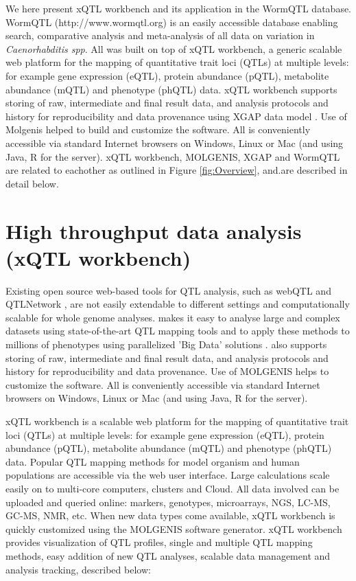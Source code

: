 We here present xQTL workbench and its application in the WormQTL database. WormQTL (http://www.wormqtl.org) is an 
easily accessible database enabling search, comparative analysis and meta-analysis of all data on variation in \emph{Caenorhabditis spp}.
All was built on top of xQTL workbench, a generic scalable web platform for the mapping of quantitative trait loci (QTLs)
 at multiple levels: for example gene expression (eQTL), protein abundance (pQTL), metabolite abundance (mQTL) and phenotype 
(phQTL) data. xQTL workbench supports storing of raw, intermediate and final result data, and analysis protocols and history 
for reproducibility and data provenance using XGAP data model \cite{Swertz:2010a}. Use of Molgenis \cite{Swertz:2010b} helped 
to build and customize the software. All is conveniently accessible via standard Internet browsers on Windows, Linux or Mac 
(and using Java, R for the server). xQTL workbench, MOLGENIS, XGAP and WormQTL are related to eachother as outlined in 
Figure \ref{fig:Overview}, and.are described in detail below.

\section{High throughput data analysis (xQTL workbench)}
Existing open source web-based tools for QTL analysis, such as webQTL \cite{Wang:2003, Chesler:2004} and 
QTLNetwork \cite{Yang:2008}, are not easily extendable to different settings and computationally 
scalable for whole genome analyses. \xqtlwb makes it easy to analyse large and complex 
datasets using state-of-the-art QTL mapping tools and to apply these methods to millions of 
phenotypes using parallelized 'Big Data' solutions \cite{Trelles:2011}.
\xqtlwb also supports storing of raw, intermediate and final result data, and analysis protocols 
and history for reproducibility and data provenance. Use of MOLGENIS\cite{Swertz:2010b} 
helps to customize the software. All is conveniently accessible via standard Internet browsers on 
Windows, Linux or Mac (and using Java, R for the server).

xQTL workbench is a scalable web platform for the mapping of quantitative trait loci (QTLs) 
at multiple levels: for example gene expression (eQTL), protein abundance (pQTL), metabolite 
abundance (mQTL) and phenotype (phQTL) data. Popular QTL mapping methods for model organism 
and human populations are accessible via the web user interface. Large calculations scale 
easily on to multi-core computers, clusters and Cloud. All data involved can be uploaded 
and queried online: markers, genotypes, microarrays, NGS, LC-MS, GC-MS, NMR, etc. When new 
data types come available, xQTL workbench is quickly customized using the MOLGENIS software 
generator. xQTL workbench provides visualization of QTL profiles, single and multiple QTL 
mapping methods, easy addition of new QTL analyses, scalable data management and analysis 
tracking, described below:

